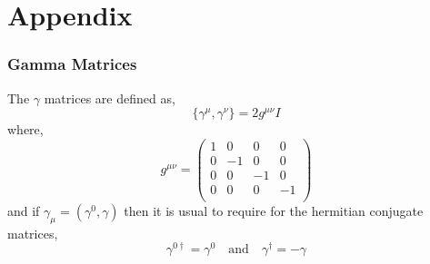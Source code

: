 
\newpage 

\chapter{Appendix}

\subsection{Gamma Matrices}
The $\gamma$ matrices are defined as, 
\begin{equation}
\{  \gamma^\mu , \gamma^\nu \} = 2 g^{\mu \nu} I 
\end{equation}
where, 
\begin{equation}
g^{ \mu \nu } = 
\begin{pmatrix}
1 & 0 & 0 & 0 \\
0 & -1 & 0 & 0  \\
0 & 0 & -1 & 0 \\
0 & 0 & 0 & -1 \\
\end{pmatrix}
\end{equation}
and if $\gamma_\mu = (\gamma^0, \gamma)$  then it is usual to require for the hermitian conjugate matrices,
\begin{equation}
\gamma^{0 \dagger} = \gamma^0 \quad \textrm{and} \quad \gamma^\dagger = - \gamma 
\end{equation}